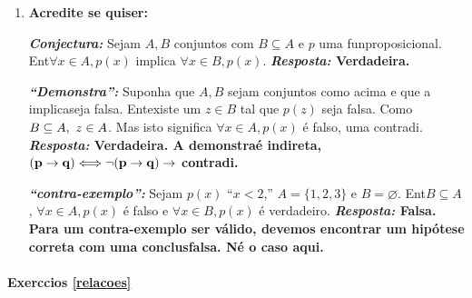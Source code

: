 \begin{enumerate}[{\bf 1.}]
\begin{enumerate}[a)]
\item $[\exists x\in D\mid  p(x)\ee \exists x\in D\mid  q(x)];[\exists x\in D\mid  p(x)\ee q(x)]$.

{\bf{\it Resposta:} A primeira se\'a verdade quando ${\bf P\neq\varnothing}$ e ${\bf Q\neq\varnothing}$; a segunda ser\'a verdade quando ${\bf P\inter Q\neq\varnothing}$ . Certamente a segunda condi\cao implica a primeira. Se ${\bf D=\mathbb{N}}$, ${\bf p(x)}$, ${\bf p(x)}$ \'e ``${\bf x}$ \'e par'' e ${\bf q(x)}$ \'e ``${\bf x}$ \' \ih mpar'' ent\ao a primeira \'e verdade e a segunda \'e falsa.}

\item $[\exists x\in D\mid  p(x)\to q(x)];[\exists x\in D\mid  p(x) \to \exists x\in D\mid  q(x)]$.
\end{enumerate}

\item {\bf Acredite se quiser:}  

\noindent \textit{\textbf{Conjectura:}} Sejam $A,B$ conjuntos com $B\subseteq A$ e $p$ uma fun\cao proposicional. Ent\ao $\forall x\in A, p(x)$ implica $\forall x\in B, p(x)$. {\bf{\it Resposta:} Verdadeira.}

\noindent \textit{\textbf{``Demonstra\caoi'':}} Suponha que $A,B$ sejam conjuntos como acima e que a implica\cao seja falsa. Ent\ao existe um $z\in B$ tal que $p(z)$ seja falsa. Como $B\subseteq A, \textrm{ } z\in A$. Mas isto significa $\forall x \in A, p(x)$ \'e falso, uma contradi\caoi. {\bf{\it Resposta:} Verdadeira. A demonstra\cao \'e indireta, ${\bf (p\to q) \Longleftrightarrow \lnot(p\to q)\to}$ contradi\caoi.}

\noindent \textit{\textbf{``contra-exemplo'':}} Sejam $p(x)$ ``$x<2$,'' $A=\{1,2,3\}$ e $B=\varnothing$. Ent\ao $B\subseteq A$, $\forall x \in A, p(x)$ \'e falso e $\forall x \in B, p(x)$ \'e verdadeiro. {\bf{\it Resposta:} Falsa. Para um contra-exemplo ser v\'alido, devemos encontrar um hip\'otese correta com uma conclus\ao falsa. N\ao \'e o caso aqui.}
\end{enumerate}
\paragraph{Exerc\ih cios \ref{relacoes}}


